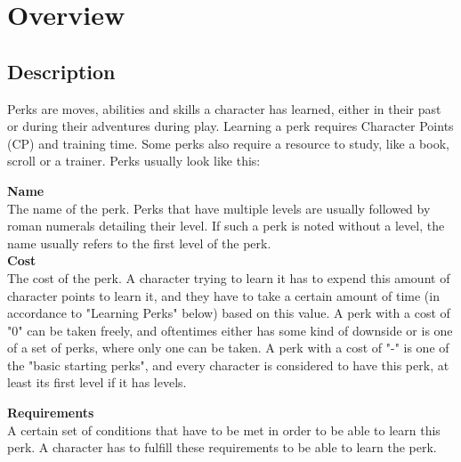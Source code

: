 \chapter{Overview}
\section{Description}
Perks are moves, abilities and skills a character has learned, either in their past or during their adventures during play. Learning a perk requires Character Points (CP) and training time. Some perks also require a resource to study, like a book, scroll or a trainer. Perks usually look like this:

\textbf{Name}\\
The name of the perk. Perks that have multiple levels are usually followed by roman numerals detailing their level. If such a perk is noted without a level, the name usually refers to the first level of the perk.\\

\textbf{Cost}\\
The cost of the perk. A character trying to learn it has to expend this amount of character points to learn it, and they have to take a certain amount of time (in accordance to "Learning Perks" below) based on this value. A perk with a cost of "0" can be taken freely, and oftentimes either has some kind of downside or is one of a set of perks, where only one can be taken. A perk with a cost of "-" is one of the "basic starting perks", and every character is considered to have this perk, at least its first level if it has levels.

\textbf{Requirements}\\
A certain set of conditions that have to be met in order to be able to learn this perk. A character has to fulfill these requirements to be able to learn the perk.

